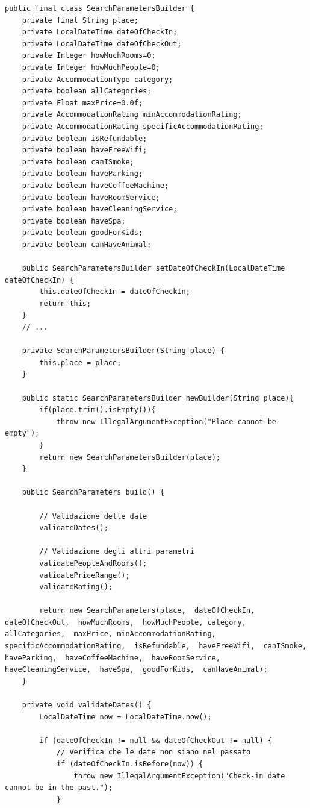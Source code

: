 \documentclass[10pt]{article}
\begin{document}
\begin{lstlisting}
public final class SearchParametersBuilder {
    private final String place;
    private LocalDateTime dateOfCheckIn;
    private LocalDateTime dateOfCheckOut;
    private Integer howMuchRooms=0;
    private Integer howMuchPeople=0;
    private AccommodationType category;
    private boolean allCategories;
    private Float maxPrice=0.0f;
    private AccommodationRating minAccommodationRating;
    private AccommodationRating specificAccommodationRating;
    private boolean isRefundable;
    private boolean haveFreeWifi;
    private boolean canISmoke;
    private boolean haveParking;
    private boolean haveCoffeeMachine;
    private boolean haveRoomService;
    private boolean haveCleaningService;
    private boolean haveSpa;
    private boolean goodForKids;
    private boolean canHaveAnimal;

    public SearchParametersBuilder setDateOfCheckIn(LocalDateTime dateOfCheckIn) {
        this.dateOfCheckIn = dateOfCheckIn;
        return this;
    }
    // ...
    
    private SearchParametersBuilder(String place) {
        this.place = place;
    }

    public static SearchParametersBuilder newBuilder(String place){
        if(place.trim().isEmpty()){
            throw new IllegalArgumentException("Place cannot be empty");
        }
        return new SearchParametersBuilder(place);
    }

    public SearchParameters build() {

        // Validazione delle date
        validateDates();

        // Validazione degli altri parametri
        validatePeopleAndRooms();
        validatePriceRange();
        validateRating();

        return new SearchParameters(place,  dateOfCheckIn,  dateOfCheckOut,  howMuchRooms,  howMuchPeople, category,  allCategories,  maxPrice, minAccommodationRating, specificAccommodationRating,  isRefundable,  haveFreeWifi,  canISmoke,  haveParking,  haveCoffeeMachine,  haveRoomService,  haveCleaningService,  haveSpa,  goodForKids,  canHaveAnimal);
    }

    private void validateDates() {
        LocalDateTime now = LocalDateTime.now();

        if (dateOfCheckIn != null && dateOfCheckOut != null) {
            // Verifica che le date non siano nel passato
            if (dateOfCheckIn.isBefore(now)) {
                throw new IllegalArgumentException("Check-in date cannot be in the past.");
            }


\end{lstlisting}
\end{document}
